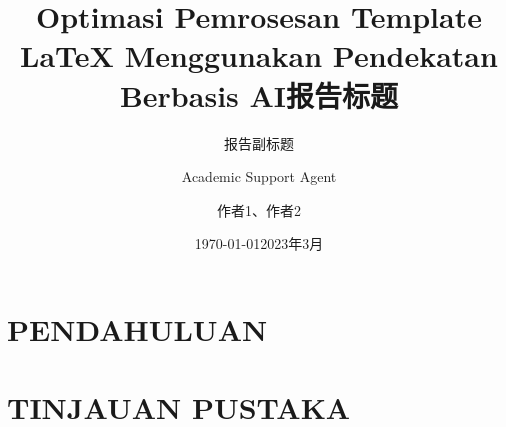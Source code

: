 \documentclass{beamer}
\title{Optimasi Pemrosesan Template LaTeX Menggunakan Pendekatan Berbasis AI}
\author{Academic Support Agent}
\date{\today}
\begin{document}
\maketitle

\begin{abstract}

\end{abstract}

\chapter{PENDAHULUAN}


\chapter{TINJAUAN PUSTAKA}


\usepackage{amsfonts,amsmath,oldgerm}
\usepackage{xeCJK}

\newcommand{\testcolor}[1]{\colorbox{#1}{\textcolor{#1}{test}}~\texttt{#1}}



\newcommand{\hrefcol}[2]{\textcolor{cyan}{\href{#1}{#2}}}

\title{报告标题}
\subtitle{报告副标题}
\author{作者1、作者2}
\date{2023年3月}
\end{document}
